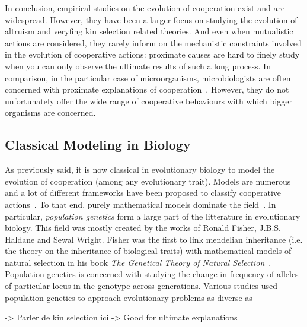     In conclusion, empirical studies on the evolution of cooperation exist and are widespread. However, they have been a larger focus on studying the evolution of altruism and veryfing kin selection related theories. And even when mutualistic actions are considered, they rarely inform on the mechanistic constraints involved in the evolution of cooperative actions: proximate causes are hard to finely study when you can only observe the ultimate results of such a long process. In comparison, in the particular case of microorganisms, microbiologists are often concerned with proximate explanations of cooperation~\cite{West2006}. However, they do not unfortunately offer the wide range of cooperative behaviours with which bigger organisms are concerned.



  \subsection{Classical Modeling in Biology}

    As previously said, it is now classical in evolutionary biology to model the evolution of cooperation (among any evolutionary trait). Models are numerous and a lot of different frameworks have been proposed to classify cooperative actions~\cite{Dugatkin2002, Sachs2004, Lehmann2006}. To that end, purely mathematical models dominate the field~\cite{Servedio2014}. In particular, \emph{population genetics} form a large part of the litterature in evolutionary biology. This field was mostly created by the works of Ronald Fisher, J.B.S. Haldane and Sewal Wright. Fisher was the first to link mendelian inheritance (i.e. the theory on the inheritance of biological traits) with mathematical models of natural selection in his book \textit{The Genetical Theory of Natural Selection}~\cite{Fisher1930}. Population genetics is concerned with studying the change in frequency of alleles of particular locus in the genotype across generations. Various studies used population genetics to approach evolutionary problems as diverse as 
    
    -> Parler de kin selection ici
    -> Good for ultimate explanations



